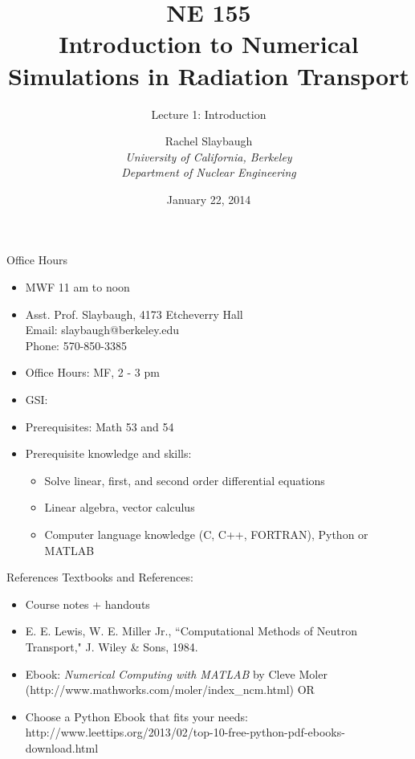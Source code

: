 \documentclass[xcolor=x11names,compress]{beamer}
\renewcommand{\(}{\begin{columns}}
\renewcommand{\)}{\end{columns}}
\newcommand{\<}[1]{\begin{column}{#1}}
\renewcommand{\>}{\end{column}}
\begin{document}
\begin{frame}
\title{NE 155\\Introduction to Numerical Simulations in Radiation Transport}
\subtitle{Lecture 1: Introduction}
\author{
        Rachel Slaybaugh\\
        \vspace*{1em}
        {\it University of California, Berkeley\\
         Department of Nuclear Engineering}\\
}
\date{January 22, 2014}
\titlepage
\end{frame}

\begin{frame}{Office Hours}
\begin{itemize}
\item MWF 11 am to noon
\item Asst. Prof. Slaybaugh, 4173 Etcheverry Hall\\
      Email: slaybaugh@berkeley.edu \\
      Phone: 570-850-3385
\item Office Hours: MF, 2 - 3 pm
\item GSI: 
\item Prerequisites: Math 53 and 54
\item Prerequisite knowledge and skills: 
\begin{itemize}
\item Solve linear, first, and second order differential equations
\item Linear algebra, vector calculus
\item Computer language knowledge (C, C++, FORTRAN), Python or MATLAB	
\end{itemize}
\end{itemize}
\end{frame}

\begin{frame}{References}
Textbooks and References:
\begin{itemize}
\item Course notes + handouts
\item E. E. Lewis, W. E. Miller Jr., ``Computational Methods of Neutron Transport," J. Wiley \& Sons, 1984.
\item Ebook: \emph{Numerical Computing with MATLAB} by Cleve Moler (http://www.mathworks.com/moler/index\_ncm.html) OR
\item Choose a Python Ebook that fits your needs:
http://www.leettips.org/2013/02/top-10-free-python-pdf-ebooks-download.html
\end{itemize}
\end{frame}
\end{document}
